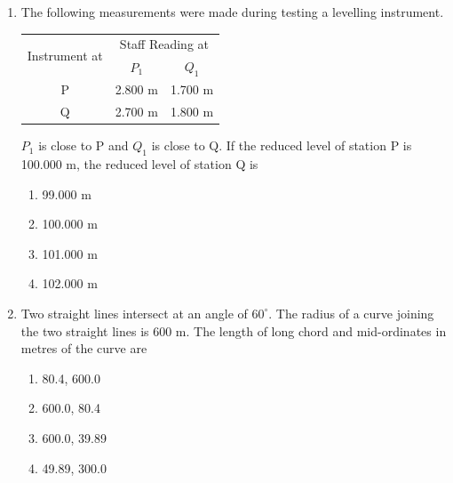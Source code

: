 \documentclass[journal,12pt,onecolumn]{IEEEtran}
\theoremstyle{remark}
\begin{document}
\begin{enumerate}
The magnitude and direction of error of closure in whole circle bearing are

\hfill{}
\begin{enumerate}
\item 2.0 m and $45^\circ$
\item 2.0 m and $315^\circ$
\item 2.82 m and $315^\circ$
\item 3.42 m and $45^\circ$
\end{enumerate}

\item The following measurements were made during testing a levelling instrument.

\begin{table}[H]
\centering
\begin{tabular}{| c | c c |}
\hline
\multirow{2}{*}{Instrument at} & \multicolumn{2}{c|}{Staff Reading at} \\
\cline{2-3}
& $P_1$\hspace{10pt} & $Q_1$\hspace{10pt} \\
\hline
P & 2.800 m & 1.700 m \\
Q & 2.700 m & 1.800 m \\
\hline
\end{tabular}
\end{table}

$P_1$ is close to P and $Q_1$ is close to Q. If the reduced level of station P is 100.000 m, the reduced level of station Q is

\hfill{}
\begin{enumerate}
\item 99.000 m
\item 100.000 m
\item 101.000 m
\item 102.000 m
\end{enumerate}

\item Two straight lines intersect at an angle of $60^\circ$. The radius of a curve joining the two straight lines is 600 m. The length of long chord and mid-ordinates in metres of the curve are

\hfill{}
\begin{enumerate}
\item 80.4, 600.0
\item 600.0, 80.4
\item 600.0, 39.89
\item 49.89, 300.0
\end{enumerate}


\end{enumerate}
\end{document}
